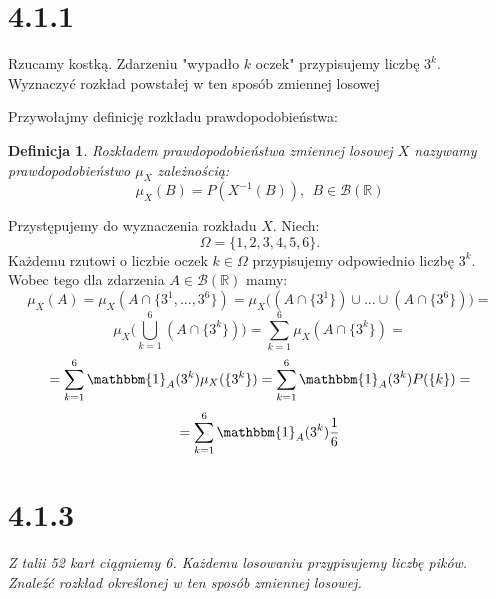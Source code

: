 \documentclass{article}
\newtheorem*{definition}{Definicja}
\begin{document}
\section*{4.1.1}
\begin{center}
    Rzucamy kostką. Zdarzeniu "wypadło \(k\) oczek" przypisujemy liczbę \(3^k\). Wyznaczyć rozkład powstałej w ten sposób
    zmiennej losowej
\end{center}

Przywołajmy definicję rozkładu prawdopodobieństwa:
\begin{definition}
Rozkładem prawdopodobieństwa zmiennej losowej \(X\) nazywamy prawdopodobieństwo \(\mu_{X}\) zależnością:
\begin{equation*}
        \mu_{X}(B) = P(X^{-1}(B)), \ \ B \in \mathcal{B}(\mathbb{R})
\end{equation*}
\end{definition}
\noindent
Przystępujemy do wyznaczenia rozkładu \(X\). Niech: 
\begin{equation*}
    \Omega = \{1, 2, 3, 4, 5, 6\}.
\end{equation*}
Każdemu rzutowi o liczbie oczek \(k \in \Omega\) przypisujemy odpowiednio liczbę \(3^k\). Wobec tego dla
zdarzenia \(A \in \mathcal{B}(\mathbb{R})\) mamy:
\begin{equation*}
    \mu_{X}(A) = \mu_{X}(A \cap \{3^1, \dots, 3^6\}) = \mu_{X}\Big((A \cap \{3^1\}) \cup \dots \cup (A \cap \{3^6\})\Big) =
\end{equation*}
\begin{equation*}
    \mu_{X}\Biggr(\bigcup_{k=1}^{6}(A \cap \{3^k\})\Biggr) = \sum_{k=1}^{6} \mu_{X}(A \cap \{3^k\}) = 
\end{equation*}
\begin{equation*}
    = \sum_{k=1}^{6} \mathbbm{1}_{A}(3^k) \mu_{X}(\{3^k\}) = \sum_{k=1}^{6} \mathbbm{1}_{A}(3^k) P(\{k\}) = 
\end{equation*}
\begin{equation*}
    = \sum_{k=1}^{6} \mathbbm{1}_{A}(3^k) \frac{1}{6}
\end{equation*}

\section*{4.1.3}

\begin{center}
    \emph{Z talii 52 kart ciągniemy 6. Każdemu losowaniu przypisujemy liczbę pików. Znaleźć rozkład określonej w ten sposób
zmiennej losowej.}
\end{center}
\end{document}
